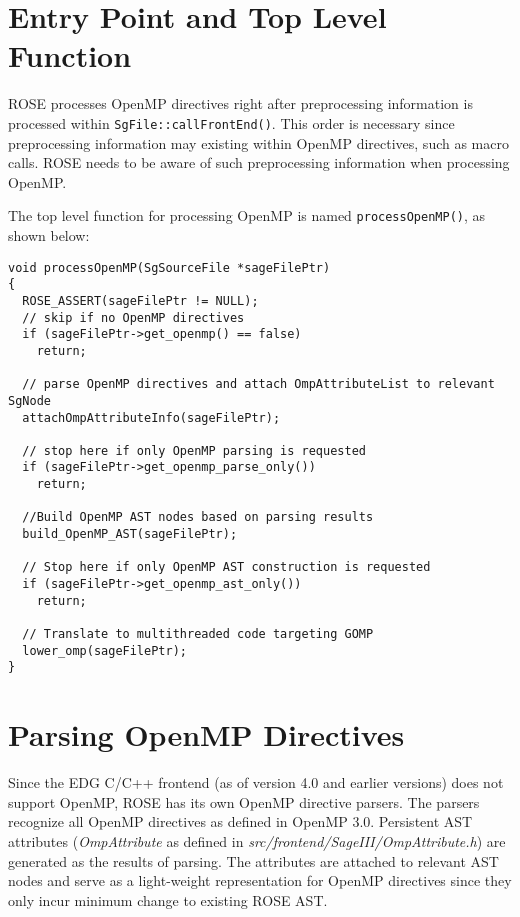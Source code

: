 \section{Entry Point and Top Level Function}
ROSE processes OpenMP directives right after preprocessing information is processed within \lstinline{SgFile::callFrontEnd()}.
This order is necessary since preprocessing information may existing within
OpenMP directives, such as macro calls.
ROSE needs to be aware of such preprocessing information when processing OpenMP.

The top level function for processing OpenMP is named \lstinline{processOpenMP()}, as shown below:
\lstset{language=C,basicstyle=\scriptsize,numbers=left}
\begin{lstlisting}
void processOpenMP(SgSourceFile *sageFilePtr)
{
  ROSE_ASSERT(sageFilePtr != NULL);
  // skip if no OpenMP directives
  if (sageFilePtr->get_openmp() == false)
    return;

  // parse OpenMP directives and attach OmpAttributeList to relevant SgNode
  attachOmpAttributeInfo(sageFilePtr);

  // stop here if only OpenMP parsing is requested
  if (sageFilePtr->get_openmp_parse_only())
    return;

  //Build OpenMP AST nodes based on parsing results
  build_OpenMP_AST(sageFilePtr);

  // Stop here if only OpenMP AST construction is requested
  if (sageFilePtr->get_openmp_ast_only())
    return;

  // Translate to multithreaded code targeting GOMP
  lower_omp(sageFilePtr);
}
\end{lstlisting}
\lstset{language=C,basicstyle=\small}

\section{Parsing OpenMP Directives}
Since the EDG C/C++ frontend (as of version 4.0 and earlier versions) does not support OpenMP, 
ROSE has its own OpenMP directive parsers. 
The parsers recognize all OpenMP directives as defined in OpenMP 3.0.
Persistent AST attributes (\emph{OmpAttribute} as defined in
\textit{src/frontend/SageIII/OmpAttribute.h}) are generated as the results
of parsing.
The attributes are attached to relevant AST nodes and serve as a light-weight representation for OpenMP directives since they only incur minimum change to existing ROSE AST.


